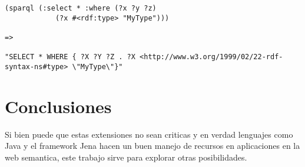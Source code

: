 \documentclass[12pt]{article}
\begin{document}
\begin{lstlisting}
(sparql (:select * :where (?x ?y ?z)
      		(?x #<rdf:type> "MyType")))

=>			

"SELECT * WHERE { ?X ?Y ?Z . ?X <http://www.w3.org/1999/02/22-rdf-syntax-ns#type> \"MyType\"}"
\end{lstlisting}

\section{Conclusiones}\label{conclusions}

Si bien puede que estas extensiones no sean criticas y en verdad lenguajes como Java y el framework Jena hacen un buen manejo de recursos en aplicaciones en la web semantica, este trabajo sirve para explorar otras posibilidades.



\end{document}
